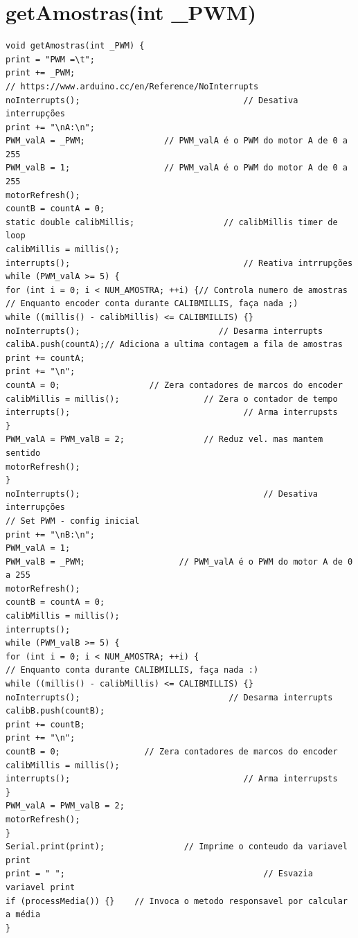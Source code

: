 \documentclass[a4paper,12pt,portuguese]{ufms-cpcx}
\begin{document}
\chapter{getAmostras(int \_PWM)}\label{anexo:getamostra}
\begin{lstlisting}
void getAmostras(int _PWM) {
print = "PWM =\t";
print += _PWM;
// https://www.arduino.cc/en/Reference/NoInterrupts
noInterrupts();									// Desativa interrupções
print += "\nA:\n";
PWM_valA = _PWM;				// PWM_valA é o PWM do motor A de 0 a 255
PWM_valB = 1;					// PWM_valA é o PWM do motor A de 0 a 255
motorRefresh();
countB = countA = 0;
static double calibMillis;				   	// calibMillis timer de loop
calibMillis = millis();
interrupts();									// Reativa intrrupções
while (PWM_valA >= 5) {
for (int i = 0; i < NUM_AMOSTRA; ++i) {// Controla numero de amostras
// Enquanto encoder conta durante CALIBMILLIS, faça nada ;)
while ((millis() - calibMillis) <= CALIBMILLIS) {}
noInterrupts();         				   // Desarma interrupts
calibA.push(countA);// Adiciona a ultima contagem a fila de amostras
print += countA;
print += "\n";
countA = 0;                  // Zera contadores de marcos do encoder
calibMillis = millis();				    // Zera o contador de tempo
interrupts();              						// Arma interrupsts
}
PWM_valA = PWM_valB = 2;				// Reduz vel. mas mantem sentido
motorRefresh();
}
noInterrupts();										// Desativa interrupções
// Set PWM - config inicial
print += "\nB:\n";
PWM_valA = 1;
PWM_valB = _PWM; 			 	   // PWM_valA é o PWM do motor A de 0 a 255
motorRefresh();
countB = countA = 0;
calibMillis = millis();
interrupts();
while (PWM_valB >= 5) {
for (int i = 0; i < NUM_AMOSTRA; ++i) {
// Enquanto conta durante CALIBMILLIS, faça nada :)
while ((millis() - calibMillis) <= CALIBMILLIS) {}
noInterrupts();								 // Desarma interrupts
calibB.push(countB);
print += countB;
print += "\n";
countB = 0;				 	// Zera contadores de marcos do encoder
calibMillis = millis();
interrupts();									// Arma interrupsts
}
PWM_valA = PWM_valB = 2;
motorRefresh();
}
Serial.print(print); 	   			// Imprime o conteudo da variavel print
print = " ";			 							// Esvazia variavel print
if (processMedia()) {}    // Invoca o metodo responsavel por calcular a média
}
\end{lstlisting}
\end{document}
